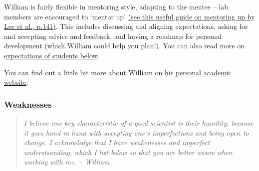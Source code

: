 \documentclass[
]{book}
\begin{document}
William is fairly flexible in mentoring style, adapting to the mentee -- lab members are encouraged to `mentor up' \href{https://graduateschool.syr.edu/wp-content/uploads/2017/03/Lee-et-al..pdf}{(see this useful guide on mentoring up by Lee et al., p.141)}. This includes discussing and aligning expectations, asking for and accepting advice and feedback, and having a roadmap for personal development (which William could help you plan!). You can also read more on \protect\hyperlink{student-expectations}{expectations of students below}.

You can find out a little bit more about William on \href{https://williamngiam.github.io}{his personal academic website}.

\hypertarget{weaknesses}{%
\subsubsection*{Weaknesses}\label{weaknesses}}

\begin{quote}
\emph{I believe one key characteristic of a good scientist is their humility, because it goes hand in hand with accepting one's imperfections and being open to change. I acknowledge that I have weakenesses and imperfect understsanding, which I list below so that you are better aware when working with me. -- William}
\end{quote}
\end{document}
